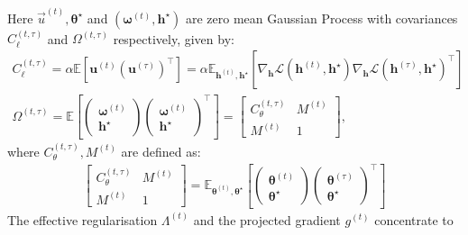 \begin{theorem}
Here $\vec u^{(t)}, \boldsymbol \theta^\star$ and $(\boldsymbol \omega^{(t)},  \boldsymbol h^\star)$ are zero mean Gaussian Process with covariances $C_\ell^{(t,\tau)}$ and $\Omega^{(t,\tau)}$ respectively, given by:
\begin{align} 
    C_\ell^{(t, \tau)}   =   \alpha\mathbb{E}\left[ \boldsymbol{u}^{(t)}\left(\boldsymbol{u}^{(\tau)}\right)^\top \right] =
    \alpha \mathbb{E}_{\boldsymbol{h}^{(t)}, \boldsymbol{h}^\star} \left[ \nabla_{\boldsymbol{h}} \mathcal{L}(\boldsymbol{h}^{(t)}, \boldsymbol{h}^\star)\nabla_{\boldsymbol{h}} \mathcal{L}(\boldsymbol{h}^{(\tau)}, \boldsymbol{h}^\star)^\top \right] \label{2402:eq:def_C_l} \\
    \Omega^{(t,\tau)}   =     \mathbb{E} \left[ \begin{pmatrix}
       \boldsymbol \omega^{(t)} \\     \boldsymbol h^\star
    \end{pmatrix} \begin{pmatrix}
        \boldsymbol \omega^{(t)}    \\ \boldsymbol h^\star  
    \end{pmatrix}^\top  \right]= \begin{bmatrix}
        C_\theta^{(t,\tau)} & M^{(t)} \\
        M^{(t)} & 1
    \end{bmatrix}\label{2402:eq:def_C_omega},
\end{align}
where $C_\theta^{(t,\tau)}, M^{(t)}$ are defined as:
\begin{align}
\begin{bmatrix}
        C_\theta^{(t,\tau)} & M^{(t)} \\
        M^{(t)} & 1
    \end{bmatrix}   =   \mathbb{E}_{\boldsymbol{\theta}^{(t)}, \boldsymbol{\theta}^\star} \left[ \begin{pmatrix}
        \boldsymbol{\theta}^{(t)} \\    \boldsymbol{\theta}^\star
    \end{pmatrix} \begin{pmatrix}
        \boldsymbol{\theta}^{(\tau)}    \\ \boldsymbol{\theta}^\star  
    \end{pmatrix}^\top  \right]
\end{align}
The effective regularisation $\Lambda^{(t)}$ and the projected gradient $g^{(t)}$ concentrate to

\end{theorem}
